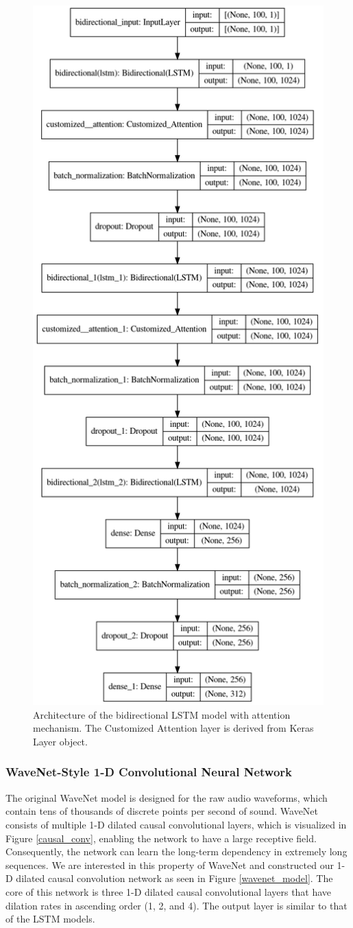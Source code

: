 \documentclass[sigconf,authorversion]{acmart}
\begin{document}
\begin{figure}[h]
  \centering
  \includegraphics[width=0.6\linewidth]{attention_model.png}
  \caption{Architecture of the bidirectional LSTM model with attention mechanism.
  The Customized Attention layer is derived from Keras Layer object.}
  \label{att_lstm_model}
\end{figure}

\subsubsection{WaveNet-Style 1-D Convolutional Neural Network}

The original WaveNet model is designed for the raw audio waveforms, which contain
tens of thousands of discrete points per second of sound. WaveNet consists of 
 multiple 1-D dilated causal convolutional layers, which is visualized in Figure 
 \ref{causal_conv}, enabling the network to have a large receptive field. Consequently,
 the network can learn the long-term dependency in extremely long sequences. We are
 interested in this property of WaveNet and constructed our 1-D dilated causal 
 convolution network as seen in Figure \ref{wavenet_model}. The core of this network
 is three 1-D dilated causal convolutional layers that have dilation rates in ascending order 
 (1, 2, and 4). The output layer is similar to that of the LSTM models.
\end{document}
